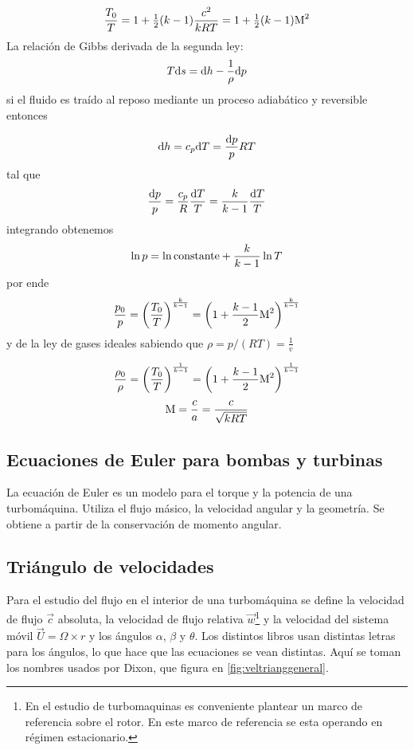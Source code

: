 \documentclass{article}
\begin{document}
\begin{equation}\label{eq:tempstagnation}
 \frac{T_0}{T}=1+\tfrac{1}{2}(k-1)\frac{c^2}{kR T}=1+\tfrac{1}{2}(k-1)\textrm{M}^2
\end{equation}
La relación de Gibbs derivada de la segunda ley:
\[T\textrm{d} s = \textrm{d} h - \frac{1}{\rho}\textrm{d} p
\]
si el fluido es traído al reposo mediante un proceso adiabático y reversible entonces

\[\textrm{d} h = c_p \textrm{d} T =\frac{\textrm{d} p}{p}R T
\]
tal que
\[
\frac{\textrm{d} p}{p} = \frac{c_p}{R}\frac{\textrm{d} T}{T} = \frac{k}{k-1}\frac{\textrm{d} T}{T}
\]
integrando obtenemos
\[
\ln p = \ln \textrm{constante} + \frac{k}{k-1}\ln T
\]
por ende
\begin{equation}
    \frac{p_0}{p}=\left(\frac{T_0}{T} \right)^{\frac{k}{k-1}} =\left(1+ \frac{k-1}{2}\textrm{M}^2 \right)^{\frac{k}{k-1}}
\end{equation}
y de la ley de gases ideales sabiendo que \(\rho = p/(RT)=\frac{1}{v} \)


\begin{equation}
    \frac{\rho_0}{\rho}=\left(\frac{T_0}{T} \right)^{\frac{1}{k-1}} =\left(1+ \frac{k-1}{2}\textrm{M}^2 \right)^{\frac{1}{k-1}}
\end{equation}
\[
\textrm{M}=\frac{c}{a} = \frac{c}{\sqrt{k R T}}
\]
\subsection{Ecuaciones de Euler para bombas y turbinas}

La ecuación de Euler es un modelo para el torque y la potencia de una turbomáquina. Utiliza el flujo másico, la velocidad angular y la geometría. Se obtiene a partir de la conservación de momento angular. 

\subsection*{Triángulo de velocidades} Para el estudio del flujo en el interior de una turbomáquina se define la velocidad de flujo $\Vec{c}$ absoluta, la velocidad de flujo relativa $\Vec{w}$\footnote{En el estudio de turbomaquinas es conveniente plantear un marco de referencia sobre el rotor. En este marco de referencia se esta operando en régimen estacionario.} y la velocidad del sistema móvil $\Vec{U}=\Omega \times r$ y los ángulos $\alpha$, $\beta$ y $\theta$. Los distintos libros usan distintas letras para los ángulos, lo que hace que las ecuaciones se vean distintas. Aquí se toman los nombres usados por Dixon, que figura en \ref{fig:veltrianggeneral}. 
\end{document}
